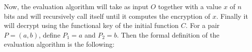 Now, the evaluation algorithm will take as input $O$ together with a value $x$ of $n$ bits and will recursively call itself until it computes the encryption of $x$. Finally it will decrypt using the functional key of the initial function $C$. For a pair $P=(a,b)$, define $P_1=a$ and $P_2=b$. Then the formal definition of the evaluation algorithm is the following:
\begin{figure}[h!]
\centering
{}
\end{figure}

\label{sec:iO-FE}